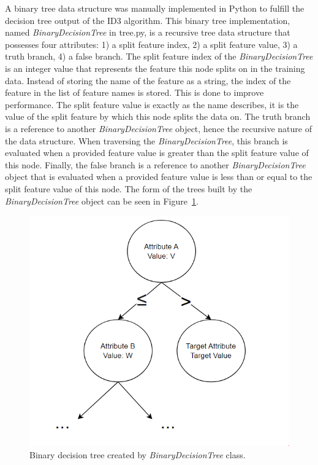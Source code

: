 \documentclass[a4paper]{article}
\begin{document}
A binary tree data structure was manually implemented in Python to fulfill the decision tree output of the ID3 algorithm. This binary tree implementation, named \textit{BinaryDecisionTree} in tree.py, is a recursive tree data structure that possesses four attributes: 1) a split feature index, 2) a split feature value, 3) a truth branch, 4) a false branch. The split feature index of the \textit{BinaryDecisionTree} is an integer value that represents the feature this node splits on in the training data. Instead of storing the name of the feature as a string, the index of the feature in the list of feature names is stored. This is done to improve performance. The split feature value is exactly as the name describes, it is the value of the split feature by which this node splits the data on. The truth branch is a reference to another \textit{BinaryDecisionTree} object, hence the recursive nature of the data structure. When traversing the \textit{BinaryDecisionTree}, this branch is evaluated when a provided feature value is greater than the split feature value of this node. Finally, the false branch is a reference to another \textit{BinaryDecisionTree} object that is evaluated when a provided feature value is less than or equal to the split feature value of this node. The form of the trees built by the \textit{BinaryDecisionTree} object can be seen in Figure~\ref{fig:binary-decision-tree}. 

\begin{figure}[h!]
    \centering
    \includegraphics[scale=0.55]{images/binary-decision-tree.PNG}
    \caption{Binary decision tree created by \textit{BinaryDecisionTree} class.}
    \label{fig:binary-decision-tree}
\end{figure}
\end{document}
